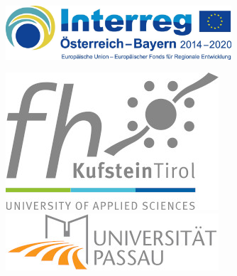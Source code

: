 \documentclass[
10pt, %
a4paper, %
oneside, %
headinclude,footinclude, %
BCOR5mm, %
]{scrartcl}
\begin{document}
\begin{figure}[htb]
    \centering
    \includegraphics[width=0.75\textwidth]{Figures/logos/Logo_INTEREG}
\end{figure}

\hfill \hfill  \break

\begin{figure}[htb]
    \centering
    \includegraphics[scale=0.4]{Figures/logos/fhku.jpg}
    \includegraphics[scale=1]{Figures/logos/unipa.jpg}
\end{figure}


\newpage

\tableofcontents %

\listoffigures %

\listoftables %


\end{document}

